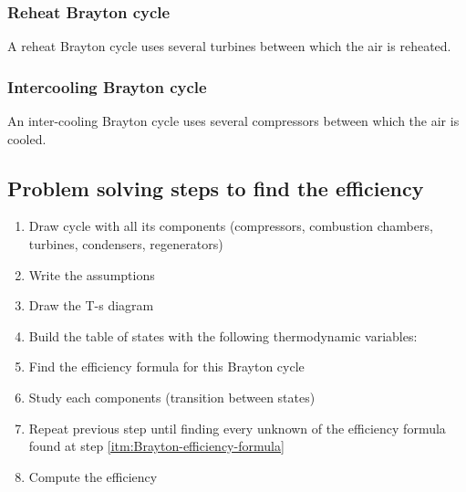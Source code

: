 \documentclass[10pt, twocolumn]{article}
\begin{document}
\subsubsection{Reheat Brayton cycle}
A reheat Brayton cycle uses several turbines between which the air is reheated.


\subsubsection{Intercooling Brayton cycle}
An inter-cooling Brayton cycle uses several compressors between which the air is cooled.


\subsection{Problem solving steps to find the efficiency}
\begin{enumerate}
  \item Draw cycle with all its components (compressors, combustion chambers, turbines, condensers, regenerators)
  \item Write the assumptions
  \item Draw the T-s diagram
  \item Build the table of states with the following thermodynamic variables:
  \item \label{itm:Brayton-efficiency-formula} Find the efficiency formula for this Brayton cycle
  \item Study each components (transition between states)
  \item Repeat previous step until finding every unknown of the efficiency formula found at step \ref{itm:Brayton-efficiency-formula}
  \item Compute the efficiency
\end{enumerate}
\end{document}
